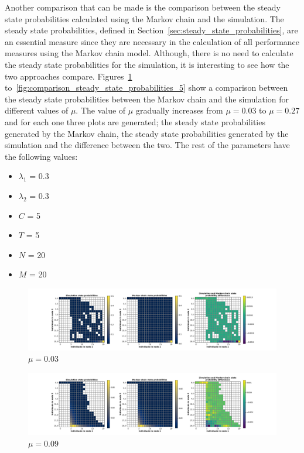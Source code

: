 Another comparison that can be made is the comparison between the steady state
probabilities calculated using the Markov chain and the simulation.
The steady state probabilities, defined in
Section~\ref{sec:steady_state_probabilities}, are an essential measure since
they are necessary in the calculation of all performance measures using the
Markov chain model.
Although, there is no need to calculate the steady state probabilities for the
simulation, it is interesting to see how the two approaches compare.
Figures~\ref{fig:comparison_steady_state_probabilities_1}
to~\ref{fig:comparison_steady_state_probabilities_5} show a comparison between
the steady state probabilities between the Markov chain and the simulation
for different values of \(\mu\).
The value of \(\mu\) gradually increases from \(\mu = 0.03\) to \(\mu = 0.27\)
and for each one three plots are generated; the steady state probabilities
generated by the Markov chain, the steady state probabilities generated by the
simulation and the difference between the two.
The rest of the parameters have the following values:

\begin{multicols}{2}
    \begin{itemize}
        \item \(\lambda_1\) = 0.3
        \item \(\lambda_2\) = 0.3
        \item \(C\) = 5
        \item \(T\) = 5
        \item \(N\) = 20
        \item \(M\) = 20
    \end{itemize}    
\end{multicols}


\begin{figure}[H]
    \includegraphics[width=\textwidth, trim=100 10 100 10, clip]{chapters/03_queueing_model/img/numeric_results_and_timings/steady_state_probabilities/main_1.pdf}
    \caption{\(\mu = 0.03\)}
    \label{fig:comparison_steady_state_probabilities_1}
\end{figure}

\begin{figure}[H]
    \includegraphics[width=\textwidth, trim=100 10 100 10, clip]{chapters/03_queueing_model/img/numeric_results_and_timings/steady_state_probabilities/main_3.pdf}
    \caption{\(\mu = 0.09\)}
    \label{fig:comparison_steady_state_probabilities_2}
\end{figure}

